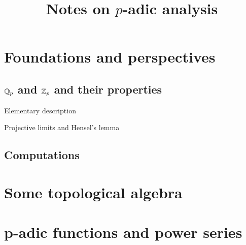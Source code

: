 \documentclass[11pt]{article}
\title{Notes on $p$-adic analysis}
\begin{document}
\maketitle
\tableofcontents
\section{Foundations and perspectives}

\subsection{$\mathbb{Q}_p$ and $\mathbb{Z}_p$ and their properties}
Elementary description

Projective limits and Hensel's lemma
\subsection{Computations}

\section{Some topological algebra}

\section{p-adic functions and power series}
\end{document}
